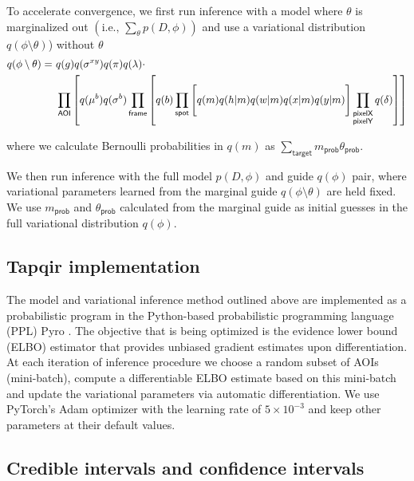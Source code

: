 To accelerate convergence, we first run inference with a model where $\theta$ is marginalized out $\left(\textrm{i.e., } \sum_\theta p(D, \phi) \right)$ and use a variational distribution $q(\phi \setminus \theta)$) without $\theta$
%
\begin{equation}
\begin{aligned}
    q(\phi \setminus \theta) =~&q(g) q(\sigma^{xy}) q(\pi) q(\lambda) \cdot \\
    &\prod_{\mathsf{AOI}} \left[ q(\mu^b) q(\sigma^b) \prod_{\mathsf{frame}} \left[ \vphantom{\prod_{F}} q(b) \prod_{\mathsf{spot}} \left[ \vphantom{\prod_{F}} q(m) q(h | m) q(w | m) q(x | m) q(y | m) \right] \prod_{\substack{\mathsf{pixelX} \\ \mathsf{pixelY}}} q(\delta) \right] \right]
\end{aligned}
\end{equation}

where we calculate Bernoulli probabilities in $q(m)$ as $\sum_\mathsf{target} m_\mathsf{prob} \theta_\mathsf{prob}$. 

We then run inference with the full model $p(D, \phi)$ and guide $q(\phi)$ pair, where variational parameters learned from the marginal guide $q(\phi \setminus \theta)$ are held fixed.  We use $m_\mathsf{prob}$ and $\theta_\mathsf{prob}$ calculated from the marginal guide as initial guesses in the full variational distribution $q(\phi)$.

\subsection*{Tapqir implementation}

The model and variational inference method outlined above are implemented as a probabilistic program in the Python-based probabilistic programming language (PPL) Pyro \cite{Foerster2018-kd,Bingham2019-qy,Obermeyer2019-xt}. The objective that is being optimized is the evidence lower bound (ELBO) estimator that provides unbiased gradient estimates upon differentiation. At each iteration of inference procedure we choose a random subset of AOIs (mini-batch), compute a differentiable ELBO estimate based on this mini-batch and update the variational parameters via automatic differentiation. We use PyTorch's Adam optimizer \cite{Kingma2014-cz} with the learning rate of $5\times 10^{-3}$ and keep other parameters at their default values. 


\subsection*{Credible intervals and confidence intervals}

